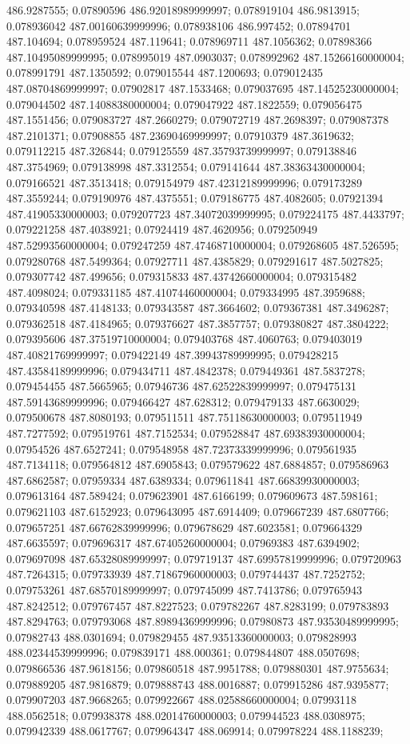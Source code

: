 486.9287555; 0.07890596 486.92018989999997; 0.078919104 486.9813915; 0.078936042 487.00160639999996; 0.078938106 486.997452; 0.07894701 487.104694; 0.078959524 487.119641; 0.078969711 487.1056362; 0.07898366 487.10495089999995; 0.078995019 487.0903037; 0.078992962 487.15266160000004; 0.078991791 487.1350592; 0.079015544 487.1200693; 0.079012435 487.08704869999997; 0.07902817 487.1533468; 0.079037695 487.14525230000004; 0.079044502 487.14088380000004; 0.079047922 487.1822559; 0.079056475 487.1551456; 0.079083727 487.2660279; 0.079072719 487.2698397; 0.079087378 487.2101371; 0.07908855 487.23690469999997; 0.07910379 487.3619632; 0.079112215 487.326844; 0.079125559 487.35793739999997; 0.079138846 487.3754969; 0.079138998 487.3312554; 0.079141644 487.38363430000004; 0.079166521 487.3513418; 0.079154979 487.42312189999996; 0.079173289 487.3559244; 0.079190976 487.4375551; 0.079186775 487.4082605; 0.07921394 487.41905330000003; 0.079207723 487.34072039999995; 0.079224175 487.4433797; 0.079221258 487.4038921; 0.07924419 487.4620956; 0.079250949 487.52993560000004; 0.079247259 487.47468710000004; 0.079268605 487.526595; 0.079280768 487.5499364; 0.07927711 487.4385829; 0.079291617 487.5027825; 0.079307742 487.499656; 0.079315833 487.43742660000004; 0.079315482 487.4098024; 0.079331185 487.41074460000004; 0.079334995 487.3959688; 0.079340598 487.4148133; 0.079343587 487.3664602; 0.079367381 487.3496287; 0.079362518 487.4184965; 0.079376627 487.3857757; 0.079380827 487.3804222; 0.079395606 487.37519710000004; 0.079403768 487.4060763; 0.079403019 487.40821769999997; 0.079422149 487.39943789999995; 0.079428215 487.43584189999996; 0.079434711 487.4842378; 0.079449361 487.5837278; 0.079454455 487.5665965; 0.07946736 487.62522839999997; 0.079475131 487.59143689999996; 0.079466427 487.628312; 0.079479133 487.6630029; 0.079500678 487.8080193; 0.079511511 487.75118630000003; 0.079511949 487.7277592; 0.079519761 487.7152534; 0.079528847 487.69383930000004; 0.07954526 487.6527241; 0.079548958 487.72373339999996; 0.079561935 487.7134118; 0.079564812 487.6905843; 0.079579622 487.6884857; 0.079586963 487.6862587; 0.07959334 487.6389334; 0.079611841 487.66839930000003; 0.079613164 487.589424; 0.079623901 487.6166199; 0.079609673 487.598161; 0.079621103 487.6152923; 0.079643095 487.6914409; 0.079667239 487.6807766; 0.079657251 487.66762839999996; 0.079678629 487.6023581; 0.079664329 487.6635597; 0.079696317 487.67405260000004; 0.07969383 487.6394902; 0.079697098 487.65328089999997; 0.079719137 487.69957819999996; 0.079720963 487.7264315; 0.079733939 487.71867960000003; 0.079744437 487.7252752; 0.079753261 487.68570189999997; 0.079745099 487.7413786; 0.079765943 487.8242512; 0.079767457 487.8227523; 0.079782267 487.8283199; 0.079783893 487.8294763; 0.079793068 487.89894369999996; 0.07980873 487.93530489999995; 0.07982743 488.0301694; 0.079829455 487.93513360000003; 0.079828993 488.02344539999996; 0.079839171 488.000361; 0.079844807 488.0507698; 0.079866536 487.9618156; 0.079860518 487.9951788; 0.079880301 487.9755634; 0.079889205 487.9816879; 0.079888743 488.0016887; 0.079915286 487.9395877; 0.079907203 487.9668265; 0.079922667 488.02588660000004; 0.07993118 488.0562518; 0.079938378 488.02014760000003; 0.079944523 488.0308975; 0.079942339 488.0617767; 0.079964347 488.069914; 0.079978224 488.1188239; 